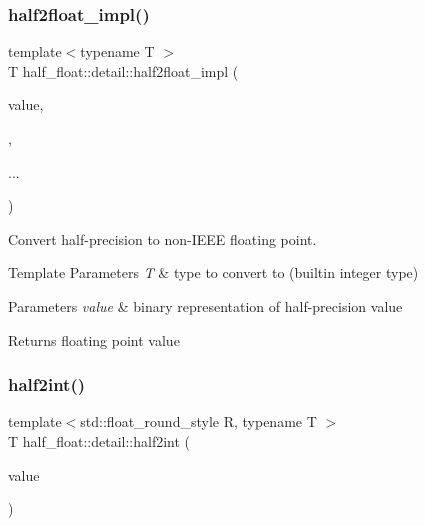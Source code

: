 \subsubsection{\texorpdfstring{half2float\+\_\+impl()}{half2float\_impl()}\hspace{0.1cm}{\footnotesize\ttfamily [3/3]}}
{\footnotesize\ttfamily template$<$typename T $>$ \\
T half\+\_\+float\+::detail\+::half2float\+\_\+impl (\begin{DoxyParamCaption}\item[{\hyperlink{namespacehalf__float_1_1detail_a239ec58092b4e4849b444baee1a01088}{uint16}}]{value,  }\item[{T}]{,  }\item[{}]{... }\end{DoxyParamCaption})}

Convert half-\/precision to non-\/\+I\+E\+EE floating point. 
\begin{DoxyTemplParams}{Template Parameters}
{\em T} & type to convert to (builtin integer type) \\
\hline
\end{DoxyTemplParams}

\begin{DoxyParams}{Parameters}
{\em value} & binary representation of half-\/precision value \\
\hline
\end{DoxyParams}
\begin{DoxyReturn}{Returns}
floating point value 
\end{DoxyReturn}
\mbox{\label{namespacehalf__float_1_1detail_a78bf248e5c07c8b73adbb0986b430675}} 
\subsubsection{\texorpdfstring{half2int()}{half2int()}}
{\footnotesize\ttfamily template$<$std\+::float\+\_\+round\+\_\+style R, typename T $>$ \\
T half\+\_\+float\+::detail\+::half2int (\begin{DoxyParamCaption}\item[{\hyperlink{namespacehalf__float_1_1detail_a239ec58092b4e4849b444baee1a01088}{uint16}}]{value }\end{DoxyParamCaption})}

